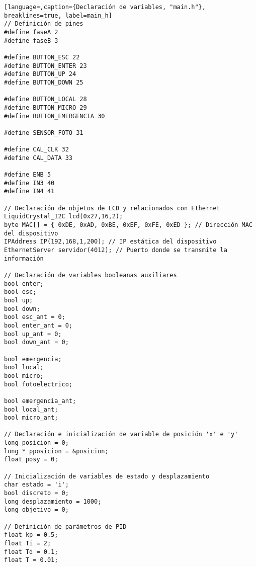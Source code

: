 
\begin{lstlisting}[language=,caption={Declaración de variables, "main.h"}, breaklines=true, label=main_h]
// Definición de pines
#define faseA 2
#define faseB 3

#define BUTTON_ESC 22
#define BUTTON_ENTER 23
#define BUTTON_UP 24
#define BUTTON_DOWN 25

#define BUTTON_LOCAL 28
#define BUTTON_MICRO 29
#define BUTTON_EMERGENCIA 30

#define SENSOR_FOTO 31

#define CAL_CLK 32
#define CAL_DATA 33

#define ENB 5
#define IN3 40
#define IN4 41

// Declaración de objetos de LCD y relacionados con Ethernet
LiquidCrystal_I2C lcd(0x27,16,2);
byte MAC[] = { 0xDE, 0xAD, 0xBE, 0xEF, 0xFE, 0xED }; // Dirección MAC del dispositivo
IPAddress IP(192,168,1,200); // IP estática del dispositivo
EthernetServer servidor(4012); // Puerto donde se transmite la información

// Declaración de variables booleanas auxiliares
bool enter;
bool esc;
bool up;
bool down;
bool esc_ant = 0;
bool enter_ant = 0;
bool up_ant = 0;
bool down_ant = 0;

bool emergencia;
bool local;
bool micro;
bool fotoelectrico;

bool emergencia_ant;
bool local_ant;
bool micro_ant;

// Declaración e inicialización de variable de posición 'x' e 'y'
long posicion = 0;
long * pposicion = &posicion;
float posy = 0;

// Inicialización de variables de estado y desplazamiento
char estado = 'i';
bool discreto = 0;
long desplazamiento = 1000;
long objetivo = 0;

// Definición de parámetros de PID
float kp = 0.5;
float Ti = 2;
float Td = 0.1;
float T = 0.01;
    
\end{lstlisting}
